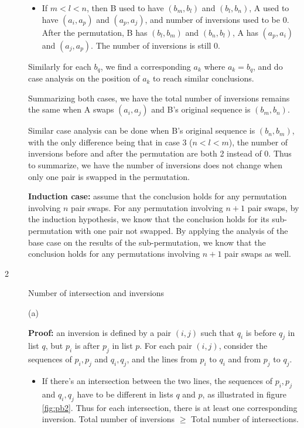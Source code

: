 \documentclass{article}
\begin{document}
\begin{description}
\begin{itemize}
  \item
  If $m < l < n$, then B used to have $(b_m, b_l)$ and $(b_l, b_n)$, A used to have $(a_i, a_p)$ and $(a_p, a_j)$, and number of inversions used to be 0. After the permutation, B has $(b_l, b_m)$ and $(b_n, b_l)$, A has $(a_p, a_i)$ and $(a_j, a_p)$. The number of inversions is still 0.
  \end{itemize}

  Similarly for each $b_q$, we find a corresponding $a_k$ where $a_k = b_q$, and do case analysis on the position of $a_k$ to reach similar conclusions.

  Summarizing both cases, we have the total number of inversions remains the same when A swaps $(a_i, a_j)$ and B's original sequence is $(b_m, b_n)$.

  Similar case analysis can be done when B's original sequence is $(b_n, b_m)$, with the only difference being that in case 3 ($n < l < m$), the number of inversions before and after the permutation are both 2 instead of 0. Thus to summarize, we have the number of inversions does not change when only one pair is swapped in the permutation.

  \textbf{Induction case:} assume that the conclusion holds for any permutation involving $n$ pair swaps. For any permutation involving $n+1$ pair swaps, by the induction hypothesis, we know that the conclusion holds for its sub-permutation with one pair not swapped. By applying the analysis of the base case on the results of the sub-permutation, we know that the conclusion holds for any permutations involving $n+1$ pair swaps as well.
  

\item[2]{Number of intersection and inversions}

  (a)

  \textbf{Proof:} an inversion is defined by a pair $(i, j)$ such that $q_i$ is before $q_j$ in list $q$, but $p_i$ is after $p_j$ in list $p$. For each pair $(i, j)$, consider the sequences of $p_i, p_j$ and $q_i, q_j$, and the lines from $p_i$ to $q_i$ and from $p_j$ to $q_j$. 

  \begin{itemize}
  \item
  If there's an intersection between the two lines, the sequences of $p_i, p_j$ and $q_i, q_j$ have to be different in lists $q$ and $p$, as illustrated in figure \ref{fig:pb2}. Thus for each intersection, there is at least one corresponding inversion. Total number of inversions $\geq$ Total number of intersections.


\end{itemize}
\end{description}
\end{document}
